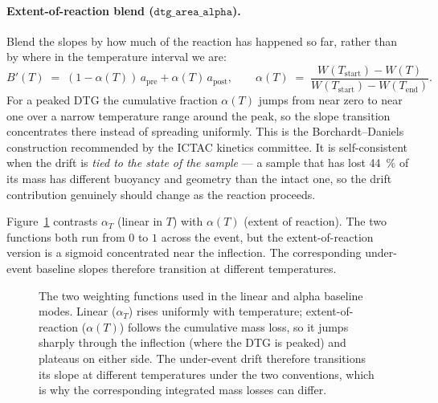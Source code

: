 \documentclass[11pt]{article}
\newcommand{\code}[1]{\texttt{#1}}
\begin{document}
\paragraph{Extent-of-reaction blend ($\code{dtg\_area\_alpha}$).}
Blend the slopes by how much of the reaction has happened so far,
rather than by where in the temperature interval we are:
\[
  B'(T) \;=\; (1 - \alpha(T))\,a_{\mathrm{pre}} + \alpha(T)\,a_{\mathrm{post}},
  \qquad
  \alpha(T) \;=\; \frac{W(T_{\mathrm{start}}) - W(T)}
                       {W(T_{\mathrm{start}}) - W(T_{\mathrm{end}})}.
\]
For a peaked DTG the cumulative fraction $\alpha(T)$ jumps from near
zero to near one over a narrow temperature range around the peak, so
the slope transition concentrates there instead of spreading
uniformly. This is the Borchardt--Daniels construction recommended by
the ICTAC kinetics committee. It is self-consistent when the drift is
\emph{tied to the state of the sample} --- a sample that has lost
\qty{44}{\percent} of its mass has different buoyancy and geometry than the
intact one, so the drift contribution genuinely should change as the
reaction proceeds.

Figure~\ref{fig:alpha} contrasts $\alpha_T$ (linear in $T$) with
$\alpha(T)$ (extent of reaction). The two functions both run from $0$
to $1$ across the event, but the extent-of-reaction version is a
sigmoid concentrated near the inflection. The corresponding under-event
baseline slopes therefore transition at different temperatures.

\begin{figure}[h]
\centering
{}
\caption{The two weighting functions used in the linear and alpha
baseline modes. Linear ($\alpha_T$) rises uniformly with temperature;
extent-of-reaction ($\alpha(T)$) follows the cumulative mass loss, so
it jumps sharply through the inflection (where the DTG is peaked) and
plateaus on either side. The under-event drift therefore transitions
its slope at different temperatures under the two conventions, which
is why the corresponding integrated mass losses can differ.}
\label{fig:alpha}
\end{figure}
\end{document}
